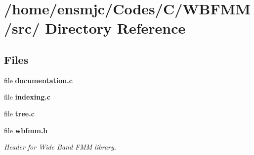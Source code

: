 \section{/home/ensmjc/\-Codes/\-C/\-W\-B\-F\-M\-M/src/ Directory Reference}
\label{dir_68267d1309a1af8e8297ef4c3efbcdba}
\subsection*{Files}
\begin{DoxyCompactItemize}
\item 
file {\bfseries documentation.\-c}
\item 
file {\bfseries indexing.\-c}
\item 
file {\bf tree.\-c}
\item 
file {\bf wbfmm.\-h}
\begin{DoxyCompactList}\small\item\em Header for Wide Band F\-M\-M library. \end{DoxyCompactList}\end{DoxyCompactItemize}
